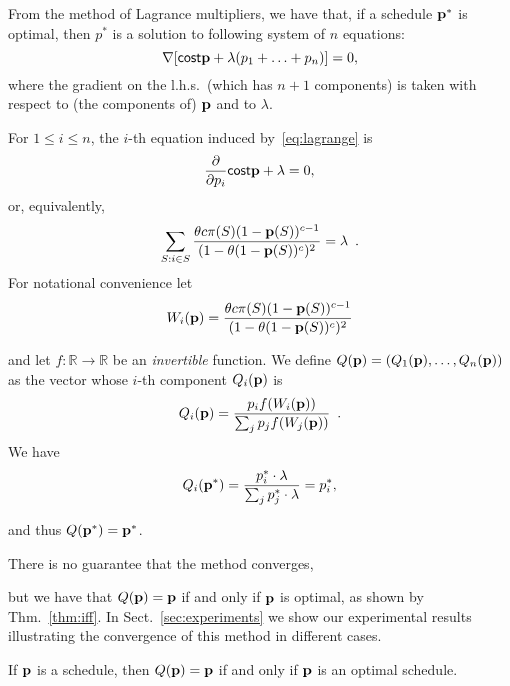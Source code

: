 
From the method of Lagrance multipliers, we have that,
if a schedule $\mathbf{p}^*$ is optimal, then $p^*$ is a solution to following system of
$n$ equations:
\begin{equation}\label{eq:lagrange}
	\nabla [\mathsf{cost}{\mathbf{p}} + \lambda (p_1+\ldots+p_n)] = 0,
\end{equation}
where the gradient on the l.h.s.~(which has $n+1$ components) is taken with
respect to (the components of) $\mathbf{p}$ and to $\lambda$.

For $1\le i\le n$, the $i$-th equation induced by~\eqref{eq:lagrange} is
\[
	\frac{\partial}{\partial p_i} \mathsf{cost}{\mathbf{p}} + \lambda = 0,
\]
or, equivalently,
\[
	\sum_{S:i\in S} \frac{\theta c \pi(S)
		(1-\mathbf{p}(S))^{c-1}}{(1-\theta(1-\mathbf{p}(S))^c)^2} = \lambda\enspace.
\]
For notational convenience let
\[
	W_i(\mathbf{p}) = \frac{\theta c \pi(S)
		(1-\mathbf{p}(S))^{c-1}}{(1-\theta(1-\mathbf{p}(S))^c)^2}
\]

and let $f: \mathbb{R} \rightarrow \mathbb{R}$ be an \emph{invertible} function.
We define $Q(\mathbf{p}) = (Q_1(\mathbf{p}), \ldots, Q_n(\mathbf{p}))$ as the vector whose $i$-th
component $Q_i(\mathbf{p})$ is
\[
	Q_i(\mathbf{p}) = \frac{p_i f(W_i(\mathbf{p}))}{\sum_{j} p_j f(W_j(\mathbf{p}))}\enspace.
\]
We have
\[
	Q_i(\mathbf{p}^*) = \frac{p^*_i\cdot \lambda}{\sum_j p^*_j\cdot \lambda} =
p^*_i,\]

and thus $Q(\mathbf{p}^*) = \mathbf{p}^*$.

There is no guarantee that the method converges,

but we have that $Q(\mathbf{p}) = \mathbf{p}$ if and only if $\mathbf{p}$ is optimal, as shown by
Thm.~\ref{thm:iff}. In Sect.~\ref{sec:experiments} we show our experimental
results illustrating the convergence of this method in different cases.

\begin{theorem}\label{thm:iff}
	If $\mathbf{p}$ is a schedule, then $Q(\mathbf{p}) = \mathbf{p}$ if and only if $\mathbf{p}$ is an optimal
	schedule.
\end{theorem}

